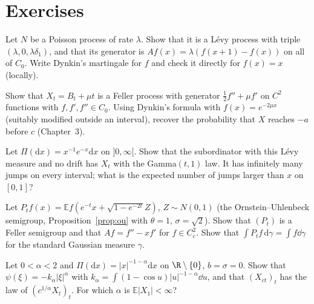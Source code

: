 \section{Exercises}

\begin{exercise}[$\star$]\label{ex:poissongen}
Let $N$ be a Poisson process of rate $\lambda$. Show that it is a L\'evy process with triple $(\lambda,0,\lambda\delta_1)$, and that its generator is $Af(x)=\lambda(f(x+1)-f(x))$ on all of $C_0$. Write Dynkin's martingale for
$f$ and check it directly for $f(x)=x$ (locally).
\end{exercise}

\begin{exercise}[$\star$]\label{ex:driftbm}
Show that $X_t=B_t+\mu t$ is a Feller process with generator $\frac12f''+\mu f'$ on $C^2$ functions with $f,f',f''\in C_0$. Using Dynkin's formula with $f(x)=e^{-2\mu x}$ (suitably modified outside an interval), recover the probability that $X$
reaches $-a$ before $c$ (Chapter~3).
\end{exercise}

\begin{exercise}[$\star$]\label{ex:gammasub}
Let $\Pi(\mathrm dx)=x^{-1}e^{-x}\mathrm dx$ on $]0,\infty[$. Show that the subordinator with this L\'evy measure and no drift has $X_t$ with the Gamma$(t,1)$ law. It has infinitely many jumps on every interval; what is the
expected number of jumps larger than $x$ on $[0,1]$?
\end{exercise}

\begin{exercise}[$\star\star$]\label{ex:mehler}
Let $P_tf(x)=\mathbb Ef(e^{-t}x+\sqrt{1-e^{-2t}}Z)$, $Z\sim N(0,1)$ (the Ornstein--Uhlenbeck semigroup, Proposition~\ref{prop:ou} with $\theta=1$, $\sigma=\sqrt2$). Show that $(P_t)$ is a Feller semigroup and that
$Af=f''-xf'$ for $f\in C^2_c$. Show that $\int P_tf\,\mathrm d\gamma=\int f\dd\gamma$ for the standard Gaussian measure $\gamma$.
\end{exercise}

\begin{exercise}[$\star\star$]\label{ex:stable}
Let $0<\alpha<2$ and $\Pi(\mathrm dx)=|x|^{-1-\alpha}\mathrm dx$ on $\R\setminus\{0\}$, $b=\sigma=0$. Show that $\psi(\xi)=-k_\alpha|\xi|^\alpha$ with $k_\alpha=\int(1-\cos u)|u|^{-1-\alpha}\dd u$, and that $(X_{ct})_t$ has the law of $(c^{1/\alpha}X_t)_t$. For which
$\alpha$ is $\mathbb E|X_1|<\infty$?
\end{exercise}

